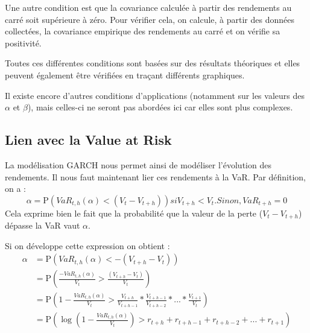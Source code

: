 			Une autre condition est que la covariance calculée à partir des rendements au carré soit supérieure à zéro.
			Pour vérifier cela, on calcule, à partir des données collectées, la covariance empirique des rendements au carré et on vérifie sa positivité.

			Toutes ces différentes conditions sont basées sur des résultats théoriques et elles peuvent également être vérifiées en traçant différents graphiques.

			Il existe encore d'autres conditions d'applications (notamment sur les valeurs des $\alpha$ et $\beta$), mais celles-ci ne seront pas abordées ici car elles sont plus complexes.


		\subsection{Lien avec la Value at Risk}
			La modélisation GARCH nous permet ainsi de modéliser l'évolution des rendements. Il nous faut maintenant lier ces rendements à la VaR.
			Par définition, on a :
			\[\alpha = \mathrm{P}(VaR_{t,h}(\alpha) < (V_t - V_{t+h})) si V_{t+h} < V_t. Sinon, VaR_{t+h} = 0\]
			Cela exprime bien le fait que la probabilité que la valeur de la perte ($V_t - V_{t+h}$) dépasse la VaR vaut $\alpha$.
			
			Si on développe cette expression on obtient : 
\begin{align}
\alpha &= \mathrm{P}(VaR_{t,h}(\alpha) < -(V_{t+h} - V_t))\\
			&= \mathrm{P}\left(\frac{-VaR_{t,h}(\alpha)}{V_t} > \frac{(V_{t+h} - V_t)}{V_t}\right)\\
			&= \mathrm{P}\left(1-\frac{VaR_{t,h}(\alpha)}{V_t} > \frac{V_{t+h}}{V_{t+h-1}}*\frac{V_{t+h-1}}{V_{t+h-2}}*...*\frac{V_{t+1}}{V_{t}}\right)\\
			&= \mathrm{P}\left(\log (1-\frac{VaR_{t,h}(\alpha)}{V_t}) > r_{t+h}+r_{t+h-1}+r_{t+h-2}+...+r_{t+1}\right)
\end{align}

